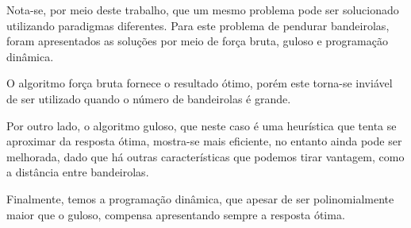 \documentclass[
	12pt,
	a4paper,
	onepage,
	brazil
]{article}
\begin{document}
	Nota-se, por meio deste trabalho, que um mesmo problema pode ser solucionado utilizando paradigmas diferentes. Para este problema de pendurar bandeirolas, foram apresentados as soluções por meio de força bruta, guloso e programação dinâmica. 
	
	O algoritmo força bruta fornece o resultado ótimo, porém este torna-se inviável de ser utilizado quando o número de bandeirolas é grande. 
	
	Por outro lado, o algoritmo guloso, que neste caso é uma heurística que tenta se aproximar da resposta ótima, mostra-se mais eficiente, no entanto ainda pode ser melhorada, dado que há outras características que podemos tirar vantagem, como a distância entre bandeirolas. 
	
	Finalmente, temos a programação dinâmica, que apesar de ser polinomialmente maior que o guloso, compensa apresentando sempre a resposta ótima.
	
	\nocite{*}
	
	\printbibliography[title=Referências]
\end{document}
